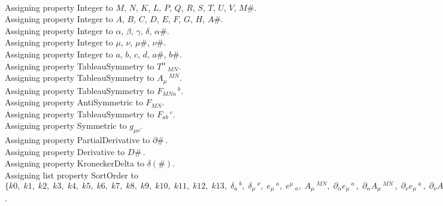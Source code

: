 \documentclass[11pt]{article}
\begin{document}
\\
Assigning property Integer to $M$, $N$, $K$, $L$, $P$, $Q$, $R$, $S$, $T$, $U$, $V$, $M\#$.
\\
Assigning property Integer to $A$, $B$, $C$, $D$, $E$, $F$, $G$, $H$, $A\#$.
\\
Assigning property Integer to $\alpha$, $\beta$, $\gamma$, $\delta$, $\alpha\#$.
\\
Assigning property Integer to $\mu$, $\nu$, $\mu\#$, $\nu\#$.
\\
Assigning property Integer to $a$, $b$, $c$, $d$, $a\#$, $b\#$.
\\
Assigning property TableauSymmetry to ${T}^{\alpha}\,_{M N}$.
\\
Assigning property TableauSymmetry to ${A}_{\mu}\,^{M N}$.
\\
Assigning property TableauSymmetry to ${F}_{M N a}\,^{b}$.
\\
Assigning property AntiSymmetric to ${F}_{M N}$.
\\
Assigning property TableauSymmetry to ${F}_{a b}\,^{c}$.
\\
Assigning property Symmetric to ${g}_{\mu \nu}$.
\\
Assigning property PartialDerivative to $\partial{\#}\, $.
\\
Assigning property Derivative to $D{\#}\, $.
\\
Assigning property KroneckerDelta to $\delta(\#)$.
\\
Assigning list property SortOrder to $\{k0,\; k1,\; k2,\; k3,\; k4,\; k5,\; k6,\; k7,\; k8,\; k9,\; k10,\; k11,\; k12,\; k13,\; {\delta}_{a}\,^{b},\; {\delta}_{\mu}\,^{\nu},\; {e}_{\mu}\,^{a},\; {e}^{\mu}\,_{a},\; {A}_{\mu}\,^{M N},\; {\partial}_{\alpha}{{e}_{\mu}\,^{a}}\, ,\; {\partial}_{\alpha}{{A}_{\mu}\,^{M N}}\, ,\; {\partial}_{\nu}{{e}_{\mu}\,^{a}}\, ,\; {\partial}_{\nu}{{A}_{\mu}\,^{M N}}\, ,\; {\partial}_{\alpha \beta}{{e}_{\mu}\,^{a}}\, ,\; {\partial}_{\alpha \beta}{{A}_{\mu}\,^{M N}}\, ,\; {\partial}_{\alpha \nu}{{e}_{\mu}\,^{a}}\, ,\; {\partial}_{\alpha \nu}{{A}_{\mu}\,^{M N}}\, ,\; {T}^{\alpha}\,_{K M}\}$.
\end{document}
